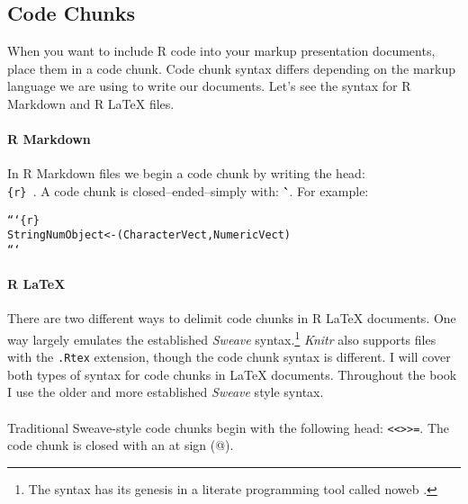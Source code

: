 \subsection{Code Chunks}

When you want to include R code into your markup presentation documents, place them in a code chunk. Code chunk syntax differs depending on the markup language we are using to write our documents. Let's see the syntax for R Markdown and R LaTeX files.

\paragraph{R Markdown}

In R Markdown files we begin a code chunk by writing the head: \texttt{\`\`\`\\ \{r\} }. A code chunk is closed--ended--simply with: \`\`\`\ . For example:

\begin{knitrout}
\color{fgcolor}\begin{kframe}
\begin{alltt}
```\{r\}
StringNumObject <- (CharacterVect, NumericVect)
```
\end{alltt}
\end{kframe}
\end{knitrout}


\paragraph{R LaTeX}

There are two different ways to delimit code chunks in R LaTeX documents. One way largely emulates the established {\emph{Sweave}} syntax.\footnote{The syntax has its genesis in a literate programming tool called noweb \cite[]{Leisch2002,RamseyNoweb}.} {\emph{Knitr}} also supports files with the {\tt{.Rtex}} extension, though the code chunk syntax is different. I will cover both types of syntax for code chunks in LaTeX documents. Throughout the book I use the older and more established {\emph{Sweave}} style syntax. \\[0.25cm]

 \\[0.25cm]

Traditional Sweave-style code chunks begin with the following head: \texttt{\textless\textless \textgreater\textgreater=}. The code chunk is closed with an at sign (@).

